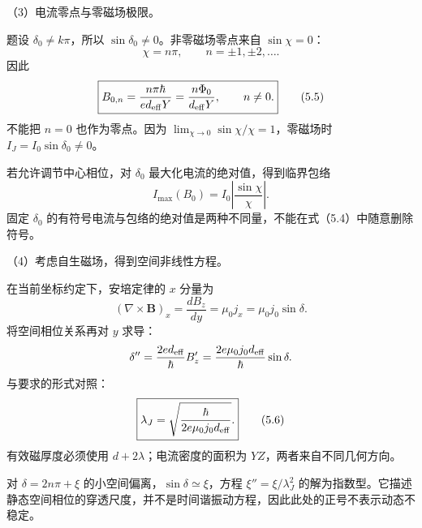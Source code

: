 \documentclass[12pt,a4paper,fontset=fandol]{ctexart}
\begin{document}
（3）电流零点与零磁场极限。

题设 \(\delta_0\ne k\pi\)，所以 \(\sin\delta_0\ne0\)。非零磁场零点来自
\(\sin\chi=0\)： \[
\chi=n\pi,\qquad n=\pm1,\pm2,\ldots.
\] 因此 \[
\boxed{B_{0,n}=\frac{n\pi\hbar}{ed_{\rm eff}Y}
=\frac{n\Phi_0}{d_{\rm eff}Y},\qquad n\ne0.}\tag{5.5}
\] 不能把 \(n=0\) 也作为零点。因为
\(\lim_{\chi\to0}\sin\chi/\chi=1\)，零磁场时
\(I_J=I_0\sin\delta_0\ne0\)。

若允许调节中心相位，对 \(\delta_0\) 最大化电流的绝对值，得到临界包络 \[
I_{\max}(B_0)=I_0\left|\frac{\sin\chi}{\chi}\right|.
\] 固定 \(\delta_0\)
的有符号电流与包络的绝对值是两种不同量，不能在式（5.4）中随意删除符号。

\begin{center}
\begin{minipage}{\linewidth}
\centering\begingroup
{}
\ifdim\wd\diagrambox>.88\linewidth
\sbox{\diagrambox}{\resizebox{.88\linewidth}{!}{\usebox{\diagrambox}}}
\fi
\ifdim\ht\diagrambox>.40\textheight
\resizebox{!}{.40\textheight}{\usebox{\diagrambox}}
\else\usebox{\diagrambox}\fi
\par{}
\endgroup\end{minipage}
\end{center}

（4）考虑自生磁场，得到空间非线性方程。

在当前坐标约定下，安培定律的 \(x\) 分量为 \[
(\nabla\times\mathbf B)_x=\frac{dB_z}{dy}
=\mu_0j_x=\mu_0j_0\sin\delta.
\] 将空间相位关系再对 \(y\) 求导： \[
\delta''=\frac{2ed_{\rm eff}}{\hbar}B_z'
=\frac{2e\mu_0j_0d_{\rm eff}}{\hbar}\sin\delta.
\] 与要求的形式对照： \[
\boxed{\lambda_J=
\sqrt{\frac{\hbar}{2e\mu_0j_0d_{\rm eff}}}.}\tag{5.6}
\] 有效磁厚度必须使用 \(d+2\lambda\)；电流密度的面积为
\(YZ\)，两者来自不同几何方向。

对 \(\delta=2n\pi+\xi\) 的小空间偏离，\(\sin\delta\simeq\xi\)，方程
\(\xi''=\xi/\lambda_J^2\)
的解为指数型。它描述静态空间相位的穿透尺度，并不是时间谐振动方程，因此此处的正号不表示动态不稳定。
\end{document}
